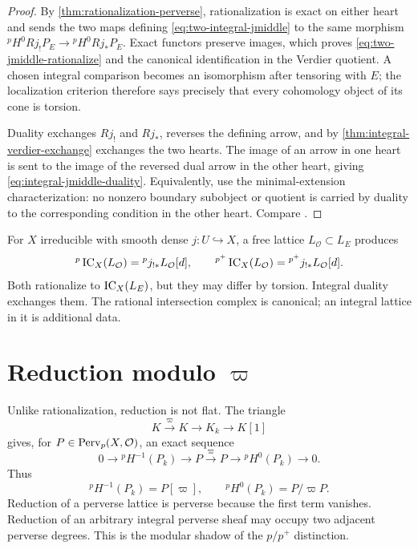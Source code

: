 \begin{proof}
By \cref{thm:rationalization-perverse}, rationalization is exact on either
heart and sends the two maps defining \eqref{eq:two-integral-jmiddle} to the
same morphism
\({}^pH^0Rj_!P_E\to{}^pH^0Rj_*P_E\).  Exact functors preserve images, which
proves \eqref{eq:two-jmiddle-rationalize} and the canonical identification in
the Verdier quotient.  A chosen integral comparison becomes an isomorphism
after tensoring with \(E\); the localization criterion therefore says
precisely that every cohomology object of its cone is torsion.

Duality exchanges \(Rj_!\) and \(Rj_*\), reverses the defining arrow, and by
\cref{thm:integral-verdier-exchange} exchanges the two hearts.  The image of
an arrow in one heart is sent to the image of the reversed dual arrow in the
other heart, giving \eqref{eq:integral-jmiddle-duality}.  Equivalently, use
the minimal-extension characterization: no nonzero boundary subobject or
quotient is carried by duality to the corresponding condition in the other
heart.  Compare \cite[\S1.4.22--1.4.25 and \S3.3.4]{BBD}.
\end{proof}

\begin{warning}
For \(X\) irreducible with smooth dense \(j:U\hookrightarrow X\), a free
lattice \(L_{\mathcal O}\subset L_E\) produces
\[
  {}^p\operatorname{IC}_X(L_{\mathcal O})={}^p j_{!*}L_{\mathcal O}[d],\qquad
  {}^{p^+}\operatorname{IC}_X(L_{\mathcal O})={}
  ^{p^+}j_{!*}L_{\mathcal O}[d].
\]
Both rationalize to \(\operatorname{IC}_X(L_E)\), but they may differ by torsion.  Integral
duality exchanges them.  The rational intersection complex is canonical;
an integral lattice in it is additional data.
\end{warning}

\section{Reduction modulo \texorpdfstring{\(\varpi\)}{the uniformizer}}

Unlike rationalization, reduction is not flat.  The triangle
\[
  K\xrightarrow{\ \varpi\ }K\longrightarrow K_k\longrightarrow K[1]
\tag{\thechapter.11}\label{eq:derived-reduction-triangle}
\]
gives, for \(P\in\operatorname{Perv}_p(X,\mathcal O)\), an exact sequence
\[
  0\longrightarrow{}^pH^{-1}(P_k)\longrightarrow P
  \xrightarrow{\ \varpi\ }P\longrightarrow{}^pH^0(P_k)\longrightarrow0.
\tag{\thechapter.12}\label{eq:perverse-reduction-tor}
\]
Thus
\[
 {}^pH^{-1}(P_k)=P[\varpi],\qquad
 {}^pH^0(P_k)=P/\varpi P.
\]
Reduction of a perverse lattice is perverse because the first term vanishes.
Reduction of an arbitrary integral perverse sheaf may occupy two adjacent
perverse degrees.  This is the modular shadow of the \(p/p^+\) distinction.

